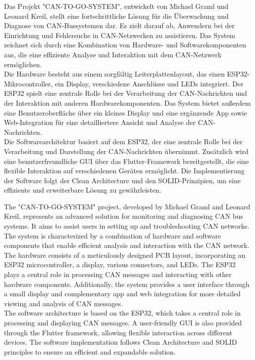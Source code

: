 \label{sec:zusammenfassung}
\noindent Das Projekt "CAN-TO-GO-SYSTEM", entwickelt von Michael Graml und Leonard Kreil, stellt eine fortschrittliche Lösung für die Überwachung und Diagnose von CAN-Bussystemen dar. Es zielt darauf ab, Anwendern bei der Einrichtung und Fehlersuche in CAN-Netzwerken zu assistieren. Das System zeichnet sich durch eine Kombination von Hardware- und Softwarekomponenten aus, die eine effiziente Analyse und Interaktion mit dem CAN-Netzwerk ermöglichen.\\

\noindent Die Hardware besteht aus einem sorgfältig Leiterplattenlayout, das einen ESP32-Mikrocontroller, ein Display, verschiedene Anschlüsse und LEDs integriert. Der ESP32 spielt eine zentrale Rolle bei der Verarbeitung der CAN-Nachrichten und der Interaktion mit anderen Hardwarekomponenten. Das System bietet außerdem eine Benutzeroberfläche über ein kleines Display und eine ergänzende App sowie Web-Integration für eine detailliertere Ansicht und Analyse der CAN-Nachrichten.\\

\noindent Die Softwarearchitektur basiert auf dem ESP32, der eine zentrale Rolle bei der Verarbeitung und Darstellung der CAN-Nachrichten übernimmt. Zusätzlich wird eine benutzerfreundliche GUI über das Flutter-Framework bereitgestellt, die eine flexible Interaktion auf verschiedenen Geräten ermöglicht. Die Implementierung der Software folgt der Clean Architecture und den SOLID-Prinzipien, um eine effiziente und erweiterbare Lösung zu gewährleisten.\\

\newpage
{}
\label{abstract}

\noindent The "CAN-TO-GO-SYSTEM" project, developed by Michael Graml and Leonard Kreil, represents an advanced solution for monitoring and diagnosing CAN bus systems. It aims to assist users in setting up and troubleshooting CAN networks. The system is characterized by a combination of hardware and software components that enable efficient analysis and interaction with the CAN network.\\

\noindent The hardware consists of a meticulously designed PCB layout, incorporating an ESP32 microcontroller, a display, various connectors, and LEDs. The ESP32 plays a central role in processing CAN messages and interacting with other hardware components. Additionally, the system provides a user interface through a small display and complementary app and web integration for more detailed viewing and analysis of CAN messages.\\

\noindent The software architecture is based on the ESP32, which takes a central role in processing and displaying CAN messages. A user-friendly GUI is also provided through the Flutter framework, allowing flexible interaction across different devices. The software implementation follows Clean Architecture and SOLID principles to ensure an efficient and expandable solution.\\